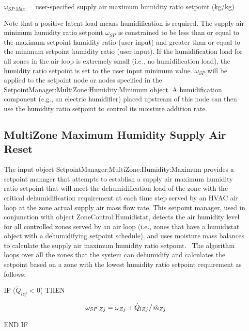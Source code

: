 \({\omega_{SP\;Max}}\) = user-specified supply air maximum humidity ratio setpoint (kg/kg)

Note that a positive latent load means humidification is required. The supply air minimum humidity ratio setpoint \({\omega_{SP}}\) is constrained to be less than or equal to the maximum setpoint humidity ratio (user input) and greater than or equal to the minimum setpoint humidity ratio (user input). If the humidification load for all zones in the air loop is extremely small (i.e., no humidification load), the humidity ratio setpoint is set to the user input minimum value. \({\omega_{SP}}\) will be applied to the setpoint node or nodes specified in the SetpointManager:MultiZone:Humidity:Minimum object. A humidification component (e.g., an electric humidifier) placed upstream of this node can then use the humidity ratio setpoint to control its moisture addition rate.

\subsection{MultiZone Maximum Humidity Supply Air Reset}\label{multizone-maximum-humidity-supply-air-reset}

The input object SetpointManager:MultiZone:Humidity:Maximum provides a setpoint manager that attempts to establish a supply air maximum humidity ratio setpoint that will meet the dehumidification load of the zone with the critical dehumidification requirement at each time step served by an HVAC air loop at the zone actual supply air mass flow rate. This setpoint manager, used in conjunction with object ZoneControl:Humidistat, detects the air humidity level for all controlled zones served by an air loop (i.e., zones that have a humidistat object with a dehumidifying setpoint schedule), and uses moisture mass balances to calculate the supply air maximum humidity ratio setpoint.~ The algorithm loops over all the zones that the system can dehumidify and calculates the setpoint based on a zone with the lowest humidity ratio setpoint requirement as follows:

IF (\({\dot Q_{lzj}}\) \textless{} 0) THEN

\begin{equation}
{\omega_{SP\;Zj}} = {\omega_{Zj}} + {{{{\dot Q}_{lZj}}} \mathord{\left/ {\vphantom {{{{\dot Q}_{lZj}}} {{{\dot m}_{Zj}}}}} \right. } {{{\dot m}_{Zj}}}}
\end{equation}

END IF

